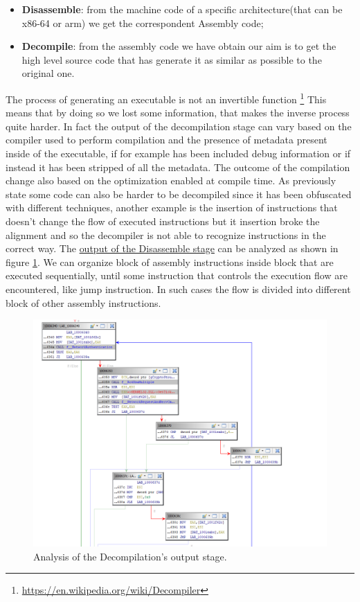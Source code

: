 \documentclass{article}
\begin{document}
\begin{itemize}
    \item \textbf{Disassemble}: from the machine code of a specific architecture(that can be x86-64 or arm) we get the correspondent Assembly code;
    \item \textbf{Decompile}: from the assembly code we have obtain our aim is to get the high level source code that has generate it as similar as possible to the original one.
\end{itemize}
The process of generating an executable is not an invertible function \footnote{\url{https://en.wikipedia.org/wiki/Decompiler}} This means that by doing so we lost some information, that makes the inverse process quite harder.
In fact the output of the decompilation stage can vary based on the compiler used to perform compilation and the presence of metadata present inside of the executable, if for example has been included debug information or if instead it has been stripped of all the metadata. The outcome of the compilation change also based on the optimization enabled at compile time.
As previously state some code can also be harder to be decompiled since it has been obfuscated with different techniques, another example is the insertion of instructions that doesn't change the flow of executed instructions but it insertion broke the alignment and so the decompiler is not able to recognize instructions in the correct way.
The \underline{output of the Disassemble stage} can be analyzed as shown in figure \ref{fig:decompilationoutput}. We can organize block of assembly instructions inside block that are executed sequentially, until some instruction that controls the execution flow are encountered, like jump instruction.
In such cases the flow is divided into different block of other assembly instructions.
\begin{figure}[htp]
    \centering
    \includegraphics[width=1\textwidth]{images/graphview.png}
    \caption{Analysis of the Decompilation's output stage.}
    \label{fig:decompilationoutput}
\end{figure}
\end{document}
